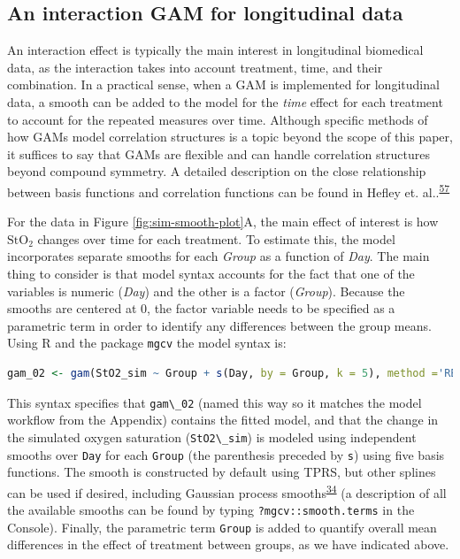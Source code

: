 \documentclass[
]{article}
\newcommand{\passthrough}[1]{#1}
\begin{document}
\hypertarget{an-interaction-gam-for-longitudinal-data}{%
\subsection{An interaction GAM for longitudinal data}\label{an-interaction-gam-for-longitudinal-data}}

An interaction effect is typically the main interest in longitudinal biomedical data, as the interaction takes into account treatment, time, and their combination. In a practical sense, when a GAM is implemented for longitudinal data, a smooth can be added to the model for the \emph{time} effect for each treatment to account for the repeated measures over time. Although specific methods of how GAMs model correlation structures is a topic beyond the scope of this paper, it suffices to say that GAMs are flexible and can handle correlation structures beyond compound symmetry. A detailed description on the close relationship between basis functions and correlation functions can be found in Hefley et. al..\textsuperscript{\protect\hyperlink{ref-hefley2017}{57}}

For the data in Figure \ref{fig:sim-smooth-plot}A, the main effect of interest is how \(\mbox{StO}_2\) changes over time for each treatment. To estimate this, the model incorporates separate smooths for each \emph{Group} as a function of \emph{Day}. The main thing to consider is that model syntax accounts for the fact that one of the variables is numeric (\emph{Day}) and the other is a factor (\emph{Group}). Because the smooths are centered at 0, the factor variable needs to be specified as a parametric term in order to identify any differences between the group means. Using R and the package \passthrough{\lstinline!mgcv!} the model syntax is:

\begin{lstlisting}[language=R]
gam_02 <- gam(StO2_sim ~ Group + s(Day, by = Group, k = 5), method ='REML', data = dat_sim)
\end{lstlisting}

This syntax specifies that \passthrough{\lstinline!gam\_02!} (named this way so it matches the model workflow from the Appendix) contains the fitted model, and that the change in the simulated oxygen saturation (\passthrough{\lstinline!StO2\_sim!}) is modeled using independent smooths over \passthrough{\lstinline!Day!} for each \passthrough{\lstinline!Group!} (the parenthesis preceded by \passthrough{\lstinline!s!}) using five basis functions. The smooth is constructed by default using TPRS, but other splines can be used if desired, including Gaussian process smooths\textsuperscript{\protect\hyperlink{ref-simpson2018}{34}} (a description of all the available smooths can be found by typing \passthrough{\lstinline!?mgcv::smooth.terms!} in the Console). Finally, the parametric term \passthrough{\lstinline!Group!} is added to quantify overall mean differences in the effect of treatment between groups, as we have indicated above.
\end{document}

